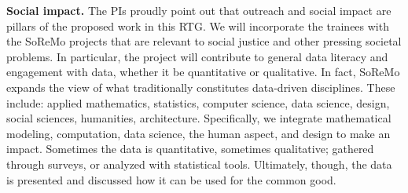 \documentclass[11pt]{NSFamsart}
\begin{document}
{ 
{\bf Social impact.} 
The PIs proudly point out that outreach and social impact are pillars of the proposed work in this RTG.
 We will incorporate the trainees with the SoReMo projects that are relevant to  social justice and other pressing societal problems. %
In particular, the project will contribute to general  data literacy and engagement with data, whether it be quantitative or qualitative. In fact, SoReMo expands the view of what traditionally constitutes data-driven disciplines. These include: applied mathematics, statistics, computer science, data science, design, social sciences, humanities, architecture. Specifically, we integrate mathematical modeling, computation, data science, the human aspect, and design to make an impact. Sometimes the data is quantitative, sometimes qualitative; gathered through surveys, or  analyzed with statistical tools. Ultimately, though, the data is presented and discussed how it can be used for the common good. 

}
\end{document}

